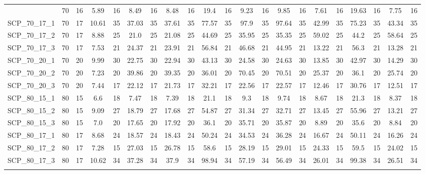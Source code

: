 \begin{sidewaystable}[!ht]
{\begin{tabular}{lcccccccccccccccccccc}
{{SCP\_70\_16\_3 & 70 & 16 &  \textcolor{blue2}{5.89} & 16 & 8.49 & 16 & 8.48 & 16 & 19.4 & 16 & 9.23 & 16 & 9.85 & 16 & 7.61 & 16 & 19.63 & 16 & 7.75 & 16 \\
SCP\_70\_17\_1 & 70 & 17 &  \textcolor{blue2}{10.61} & 35 & 37.03 & 35 & 37.61 & 35 & 77.57 & 35 & 97.9 & 35 & 97.64 & 35 & 42.99 & 35 & 75.23 & 35 & 43.34 & 35 \\
SCP\_70\_17\_2 & 70 & 17 &  \textcolor{blue2}{8.88} & 25 & 21.0 & 25 & 21.08 & 25 & 44.69 & 25 & 35.95 & 25 & 35.35 & 25 & 59.02 & 25 & 44.2 & 25 & 58.64 & 25 \\
SCP\_70\_17\_3 & 70 & 17 &  \textcolor{blue2}{7.53} & 21 & 24.37 & 21 & 23.91 & 21 & 56.84 & 21 & 46.68 & 21 & 44.95 & 21 & 13.22 & 21 & 56.3 & 21 & 13.28 & 21 \\
SCP\_70\_20\_1 & 70 & 20 &  \textcolor{blue2}{9.99} & 30 & 22.75 & 30 & 22.94 & 30 & 43.13 & 30 & 24.58 & 30 & 24.63 & 30 & 13.85 & 30 & 42.97 & 30 & 14.29 & 30 \\
SCP\_70\_20\_2 & 70 & 20 &  \textcolor{blue2}{7.23} & 20 & 39.86 & 20 & 39.35 & 20 & 36.01 & 20 & 70.45 & 20 & 70.51 & 20 & 25.37 & 20 & 36.1 & 20 & 25.74 & 20 \\
SCP\_70\_20\_3 & 70 & 20 &  \textcolor{blue2}{7.44} & 17 & 22.12 & 17 & 21.73 & 17 & 32.21 & 17 & 22.56 & 17 & 22.57 & 17 & 12.46 & 17 & 30.76 & 17 & 12.51 & 17 \\
SCP\_80\_15\_1 & 80 & 15 &  \textcolor{blue2}{6.6} & 18 & 7.47 & 18 & 7.39 & 18 & 21.1 & 18 & 9.3 & 18 & 9.74 & 18 & 8.67 & 18 & 21.3 & 18 & 8.37 & 18 \\
SCP\_80\_15\_2 & 80 & 15 &  \textcolor{blue2}{9.09} & 27 & 18.79 & 27 & 17.68 & 27 & 54.87 & 27 & 31.34 & 27 & 32.71 & 27 & 13.45 & 27 & 55.96 & 27 & 13.21 & 27 \\
SCP\_80\_15\_3 & 80 & 15 &  \textcolor{blue2}{7.0} & 20 & 17.65 & 20 & 17.92 & 20 & 36.1 & 20 & 35.71 & 20 & 35.87 & 20 & 8.89 & 20 & 35.6 & 20 & 8.84 & 20 \\
SCP\_80\_17\_1 & 80 & 17 &  \textcolor{blue2}{8.68} & 24 & 18.57 & 24 & 18.43 & 24 & 50.24 & 24 & 34.53 & 24 & 36.28 & 24 & 16.67 & 24 & 50.11 & 24 & 16.26 & 24 \\
SCP\_80\_17\_2 & 80 & 17 &  \textcolor{blue2}{7.28} & 15 & 27.03 & 15 & 26.78 & 15 & 58.6 & 15 & 28.19 & 15 & 29.01 & 15 & 24.33 & 15 & 59.5 & 15 & 24.02 & 15 \\
SCP\_80\_17\_3 & 80 & 17 &  \textcolor{blue2}{10.62} & 34 & 37.28 & 34 & 37.9 & 34 & 98.94 & 34 & 57.19 & 34 & 56.49 & 34 & 26.01 & 34 & 99.38 & 34 & 26.51 & 34 \\
}}
\end{tabular}}
\end{sidewaystable}
